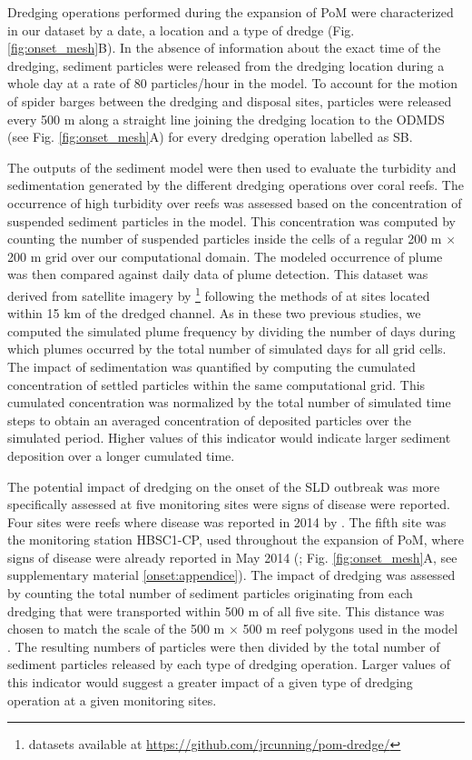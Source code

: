 \documentclass[preprint,12pt,authoryear]{elsarticle}
\begin{document}
Dredging operations performed during the expansion of PoM were characterized in our dataset by a date, a location and  a type of dredge (Fig. \ref{fig:onset_mesh}B). In the absence of information about the exact time of the dredging, sediment particles were released from the dredging location during a whole day at a rate of 80 particles/hour in the model. To account for the motion of spider barges between the dredging and disposal sites, particles were released every 500 m along a straight line joining the dredging location to the ODMDS (see Fig. \ref{fig:onset_mesh}A) for every dredging operation labelled as SB.

The outputs of the sediment model were then used to evaluate the turbidity and sedimentation generated by the different dredging operations over coral reefs. The occurrence of high turbidity over reefs was assessed based on the concentration of suspended sediment particles in the model. This concentration was computed by counting the number of suspended particles inside the cells of a regular 200 m $\times$ 200 m grid over our computational domain. The modeled occurrence of plume was then compared against daily data of plume detection. This dataset was derived from satellite imagery by \cite{cunning2019extensive}\footnote{datasets available at \url{https://github.com/jrcunning/pom-dredge/}} following the methods of \cite{barnes2015sediment} at sites located within 15 km of the dredged channel. As in these two previous studies, we computed  the simulated plume frequency by dividing the number of days during which plumes occurred by the total number of simulated days for all grid cells. The impact of sedimentation was quantified by computing the cumulated concentration of settled particles within the same computational grid. This cumulated concentration was normalized by the total number of simulated time steps to obtain an averaged concentration of deposited particles over the simulated period. Higher values of this indicator would indicate larger sediment deposition over a longer cumulated time.

The potential impact of dredging on the onset of the SLD outbreak was more specifically assessed at five monitoring sites were signs of disease were reported. Four sites were reefs where disease was reported in 2014 by \cite{precht2016unprecedented}. The fifth site was the monitoring station HBSC1-CP, used throughout the expansion of PoM, where signs of disease were already reported in May 2014 (\citealp{dial2015}; Fig. \ref{fig:onset_mesh}A, see supplementary material \ref{onset:appendice}). The impact of dredging was assessed by counting the total number of sediment particles originating from each dredging that were transported within 500 m of all five site. This distance was chosen to match the scale of the 500 m $\times$ 500 m reef polygons used in the model \citep{dobbelaere2020coupled}. The resulting numbers of particles were then divided by the total number of sediment particles released by each type of dredging operation. Larger values of this indicator would suggest a greater impact of a given type of dredging operation at a given monitoring sites.  
\end{document}
